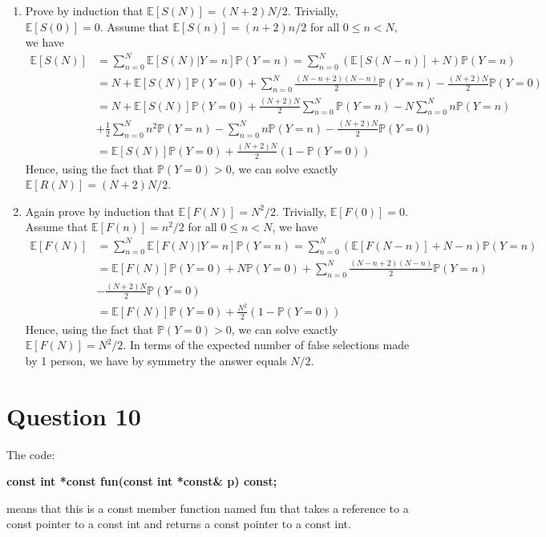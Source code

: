 \documentclass[a4paper, 11pt]{amsart}
\theoremstyle{remark}
\numberwithin{equation}{section}
\begin{document}
\begin{enumerate}
\item Prove by induction that $\mathbb{E}[S(N)] = (N+2)N/2$. Trivially, $\mathbb{E}[S(0)] = 0$.  Assume that $\mathbb{E}[S(n)] = (n+2)n/2$ for all $0\leq n < N$, we have
\begin{align*}
\mathbb{E}[S(N)] 
&= \sum_{n=0}^N\mathbb{E}[S(N)|Y = n]\mathbb{P}(Y=n) = \sum_{n=0}^N\left(\mathbb{E}[S(N-n)] + N\right)\mathbb{P}(Y=n)\\
&= N + \mathbb{E}[S(N)]\mathbb{P}(Y=0) + \sum_{n=0}^N\frac{(N-n+2)(N-n)}{2}\mathbb{P}(Y=n) - \frac{(N+2)N}{2}\mathbb{P}(Y = 0)\\
&= N + \mathbb{E}[S(N)]\mathbb{P}(Y=0) + \frac{(N+2)N}{2}\sum_{n=0}^N\mathbb{P}(Y=n) - N\sum_{n=0}^Nn\mathbb{P}(Y=n)\\
& + \frac{1}{2}\sum_{n=0}^Nn^2\mathbb{P}(Y=n) - \sum_{n=0}^Nn\mathbb{P}(Y=n) - \frac{(N+2)N}{2}\mathbb{P}(Y = 0)\\
&= \mathbb{E}[S(N)]\mathbb{P}(Y=0) + \frac{(N+2)N}{2}(1-\mathbb{P}(Y=0))
\end{align*}
Hence, using the fact that $\mathbb{P}(Y = 0) >0$, we can solve exactly $\mathbb{E}[R(N)] = (N+2)N/2$.

\item Again prove by induction that $\mathbb{E}[F(N)] = N^2/2$. Trivially, $\mathbb{E}[F(0)] = 0$.  Assume that $\mathbb{E}[F(n)] = n^2/2$ for all $0\leq n < N$, we have
\begin{align*}
\mathbb{E}[F(N)] 
&= \sum_{n=0}^N\mathbb{E}[F(N)|Y = n]\mathbb{P}(Y=n) = \sum_{n=0}^N\left(\mathbb{E}[F(N-n)] + N-n\right)\mathbb{P}(Y=n)\\
&= \mathbb{E}[F(N)]\mathbb{P}(Y = 0) + N\mathbb{P}(Y = 0) + \sum_{n = 0}^N\frac{(N-n+2)(N-n)}{2}\mathbb{P}(Y=n)\\ 
& - \frac{(N + 2)N}{2}\mathbb{P}(Y=0)\\
&= \mathbb{E}[F(N)]\mathbb{P}(Y = 0) + \frac{N^2}{2}(1-\mathbb{P}(Y=0))
\end{align*}
Hence, using the fact that $\mathbb{P}(Y = 0) >0$, we can solve exactly $\mathbb{E}[F(N)] = N^2/2$. In terms of the expected number of false selections made by 1 person, we have by symmetry the answer equals $N/2$.

\end{enumerate}
\clearpage



\section*{Question 10}
The code: 
\begin{center}
\textbf{const int *const fun(const int *const\& p) const;}
\end{center} means that this is a const member function named fun that takes a reference to a const pointer to a const int and returns a const pointer to a const int.
\end{document}
